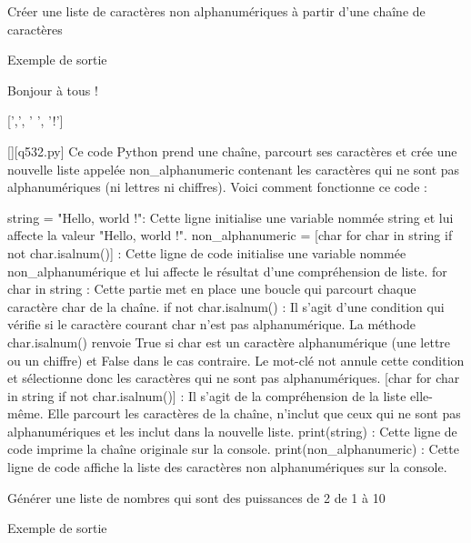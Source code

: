        \question
        Créer une liste de caractères non alphanumériques à partir d'une chaîne de caractères

Exemple de sortie

Bonjour à tous !

[',', ' ', '!']
        \par
        \begin{solution}
            \renewcommand{\nomfichier}{q532.py}
            \pythonfile{\chemincode \nomfichier}[][\nomfichier]
            Ce code Python prend une chaîne, parcourt ses caractères et crée une nouvelle liste appelée non\_alphanumeric contenant les caractères qui ne sont pas alphanumériques (ni lettres ni chiffres). Voici comment fonctionne ce code :

    string = "Hello, world !": Cette ligne initialise une variable nommée string et lui affecte la valeur "Hello, world !".
    non\_alphanumeric = [char for char in string if not char.isalnum()] : Cette ligne de code initialise une variable nommée non\_alphanumérique et lui affecte le résultat d'une compréhension de liste.
        for char in string : Cette partie met en place une boucle qui parcourt chaque caractère char de la chaîne.
        if not char.isalnum() : Il s'agit d'une condition qui vérifie si le caractère courant char n'est pas alphanumérique. La méthode char.isalnum() renvoie True si char est un caractère alphanumérique (une lettre ou un chiffre) et False dans le cas contraire. Le mot-clé not annule cette condition et sélectionne donc les caractères qui ne sont pas alphanumériques.
        [char for char in string if not char.isalnum()] : Il s'agit de la compréhension de la liste elle-même. Elle parcourt les caractères de la chaîne, n'inclut que ceux qui ne sont pas alphanumériques et les inclut dans la nouvelle liste.
    print(string) : Cette ligne de code imprime la chaîne originale sur la console.
    print(non\_alphanumeric) : Cette ligne de code affiche la liste des caractères non alphanumériques sur la console.
        \end{solution}
        

        \question
        Générer une liste de nombres qui sont des puissances de 2 de 1 à 10

Exemple de sortie

